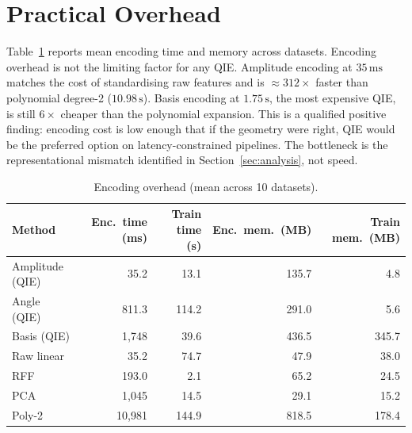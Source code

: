 \section{Practical Overhead}
\label{sec:overhead}

Table~\ref{tab:overhead} reports mean encoding time and memory across datasets.
Encoding overhead is not the limiting factor for any QIE.
Amplitude encoding at $35\,\mathrm{ms}$ matches the cost of standardising raw
features and is ${\approx}312\times$ faster than polynomial degree-2
($10.98\,\mathrm{s}$).
Basis encoding at $1.75\,\mathrm{s}$, the most expensive QIE, is still
$6\times$ cheaper than the polynomial expansion.
This is a qualified positive finding: encoding cost is low enough that if the
geometry were right, QIE would be the preferred option on latency-constrained
pipelines.
The bottleneck is the representational mismatch identified in
Section~\ref{sec:analysis}, not speed.

\begin{table}[tbp]
\centering
\caption{Encoding overhead (mean across 10 datasets).}
\label{tab:overhead}
\small
\begin{tabular}{lrrrr}
\toprule
Method & Enc.\ time (ms) & Train time (s) & Enc.\ mem.\ (MB) & Train mem.\ (MB) \\
\midrule
Amplitude (QIE) &     35.2 &    13.1 & 135.7 &   4.8 \\
Angle (QIE)     &    811.3 &   114.2 & 291.0 &   5.6 \\
Basis (QIE)     &  1{,}748 &    39.6 & 436.5 & 345.7 \\
\midrule
Raw linear      &     35.2 &    74.7 &  47.9 &  38.0 \\
RFF             &    193.0 &     2.1 &  65.2 &  24.5 \\
PCA             &  1{,}045 &    14.5 &  29.1 &  15.2 \\
Poly-2          & 10{,}981 &   144.9 & 818.5 & 178.4 \\
\bottomrule
\end{tabular}
\end{table}
